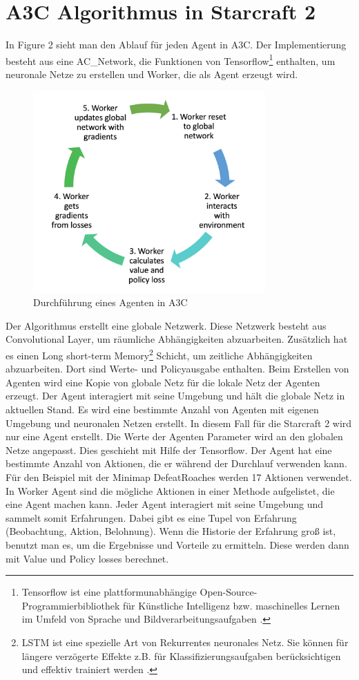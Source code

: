 \documentclass{IEEEtran}
\begin{document}
\section{A3C Algorithmus in Starcraft 2}
In Figure 2 sieht man den Ablauf für jeden Agent in A3C. Der Implementierung besteht aus eine AC\_Network, die Funktionen von Tensorflow\footnote{Tensorflow ist eine plattformunabhängige Open-Source-Programmierbibliothek für Künstliche Intelligenz bzw. maschinelles Lernen im Umfeld von Sprache und Bildverarbeitungsaufgaben \cite{Tensor}.} enthalten, um neuronale Netze zu erstellen und Worker, die als Agent erzeugt wird. 
\begin{figure}[!t]
\centering
\includegraphics[width=3.5in]{test.png}
\caption{Durchführung eines Agenten in A3C}
\label{fig_sim}
\end{figure}
Der Algorithmus erstellt eine globale Netzwerk. Diese Netzwerk besteht aus Convolutional Layer, um räumliche Abhängigkeiten abzuarbeiten. Zusätzlich hat es einen Long short-term Memory\footnote{LSTM ist eine spezielle Art von Rekurrentes neuronales Netz. Sie können für längere verzögerte Effekte z.B. für Klassifizierungsaufgaben berücksichtigen und effektiv trainiert werden \cite{LSTM}.} Schicht, um zeitliche Abhängigkeiten abzuarbeiten. Dort sind Werte- und Policyausgabe enthalten.
Beim Erstellen von Agenten wird eine Kopie von globale Netz für die lokale Netz der Agenten erzeugt. Der Agent interagiert mit seine Umgebung und hält die globale Netz in aktuellen Stand. Es wird eine bestimmte Anzahl von Agenten mit eigenen Umgebung und neuronalen Netzen erstellt. In diesem Fall für die Starcraft 2 wird nur eine Agent erstellt. Die Werte der Agenten Parameter wird an den globalen Netze angepasst. Dies geschieht mit Hilfe der Tensorflow. Der Agent hat eine bestimmte Anzahl von Aktionen, die er während der Durchlauf verwenden kann. Für den Beispiel mit der Minimap DefeatRoaches werden 17 Aktionen verwendet. In Worker Agent sind die mögliche Aktionen in einer Methode aufgelistet, die eine Agent machen kann. Jeder Agent interagiert mit seine Umgebung und sammelt somit Erfahrungen.  Dabei gibt es eine Tupel von Erfahrung (Beobachtung, Aktion, Belohnung). Wenn die Historie der Erfahrung groß ist, benutzt man es, um die Ergebnisse und Vorteile zu ermitteln. Diese werden dann mit Value und Policy losses berechnet.
\end{document}
